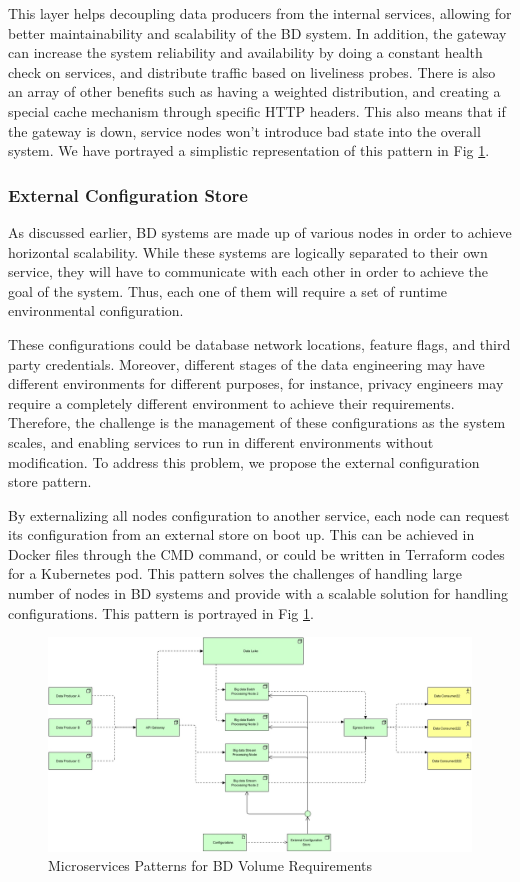 \documentclass{bmcart}
\begin{document}
This layer helps decoupling data producers from the internal services, allowing for better maintainability and scalability of the BD system. In addition, the gateway can increase the system reliability and availability by doing a constant health check on services, and distribute traffic based on liveliness probes. There is also an array of other benefits such as having a weighted distribution, and creating a special cache mechanism through specific HTTP headers. This also means that if the gateway is down, service nodes won't introduce bad state into the overall system. We have portrayed a simplistic representation of this pattern in Fig \ref{fig:VolReq}. 

\subsubsection{External Configuration Store}

As discussed earlier, BD systems are made up of various nodes in order to achieve horizontal scalability. While these systems are logically separated to their own service, they will have to communicate with each other in order to achieve the goal of the system. Thus, each one of them will require a set of runtime environmental configuration. 

These configurations could be database network locations, feature flags, and third party credentials. Moreover, different stages of the data engineering may have different environments for different purposes, for instance, privacy engineers may require a completely different environment to achieve their requirements. Therefore, the challenge is the management of these configurations as the system scales, and enabling services to run in different environments without modification. To address this problem, we propose the external configuration store pattern.

By externalizing all nodes configuration to another service, each node can request its configuration from an external store on boot up. This can be achieved in Docker files through the CMD command, or could be written in Terraform codes for a Kubernetes pod. This pattern solves the challenges of handling large number of nodes in BD systems and provide with a scalable solution for handling configurations. This pattern is portrayed in Fig \ref{fig:VolReq}.

\begin{figure}[h]
    \centering 
    \includegraphics[width=12cm]{Media/Vol-1 Requirement RA.jpg}
    \caption{Microservices Patterns for BD Volume Requirements}
    \label{fig:VolReq}
\end{figure}
\end{document}
